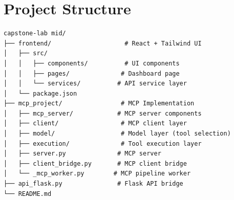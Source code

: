 \documentclass[12pt, a4paper]{report}
\begin{document}
\appendix
\chapter{Project Structure}

\begin{verbatim}
capstone-lab mid/
├── frontend/                    # React + Tailwind UI
│   ├── src/
│   │   ├── components/          # UI components
│   │   ├── pages/              # Dashboard page
│   │   └── services/          # API service layer
│   └── package.json
├── mcp_project/                # MCP Implementation
│   ├── mcp_server/            # MCP server components
│   ├── client/                 # MCP client layer
│   ├── model/                  # Model layer (tool selection)
│   ├── execution/              # Tool execution layer
│   ├── server.py              # MCP server
│   ├── client_bridge.py       # MCP client bridge
│   └── _mcp_worker.py        # MCP pipeline worker
├── api_flask.py               # Flask API bridge
└── README.md
\end{verbatim}
\end{document}
